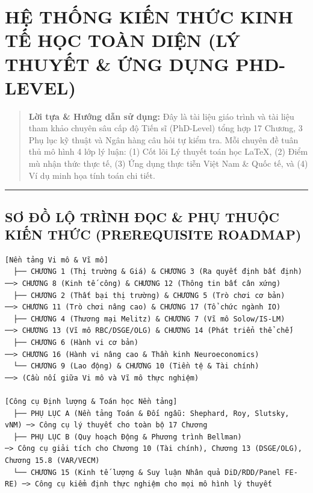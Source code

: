 \documentclass[
]{article}
\author{}
\date{}
\begin{document}
\section{HỆ THỐNG KIẾN THỨC KINH TẾ HỌC TOÀN DIỆN (LÝ THUYẾT \& ỨNG DỤNG
PHD-LEVEL)}\label{hux1ec7-thux1ed1ng-kiux1ebfn-thux1ee9c-kinh-tux1ebf-hux1ecdc-touxe0n-diux1ec7n-luxfd-thuyux1ebft-ux1ee9ng-dux1ee5ng-phd-level}

\begin{quote}
\textbf{Lời tựa \& Hướng dẫn sử dụng:} Đây là tài liệu giáo trình và tài
liệu tham khảo chuyên sâu cấp độ Tiến sĩ (PhD-Level) tổng hợp 17 Chương,
3 Phụ lục kỹ thuật và Ngân hàng câu hỏi tự kiểm tra. Mỗi chuyên đề tuân
thủ mô hình 4 lớp lý luận: (1) Cốt lõi Lý thuyết toán học LaTeX, (2)
Điểm mù nhận thức thực tế, (3) Ứng dụng thực tiễn Việt Nam \& Quốc tế,
và (4) Ví dụ minh họa tính toán chi tiết.
\end{quote}

\begin{center}\rule{0.5\linewidth}{0.5pt}\end{center}

\subsection{SƠ ĐỒ LỘ TRÌNH ĐỌC \& PHỤ THUỘC KIẾN THỨC (PREREQUISITE
ROADMAP)}\label{sux1a1-ux111ux1ed3-lux1ed9-truxecnh-ux111ux1ecdc-phux1ee5-thuux1ed9c-kiux1ebfn-thux1ee9c-prerequisite-roadmap}

\begin{verbatim}
[Nền tảng Vi mô & Vĩ mô]
  ├── CHƯƠNG 1 (Thị trường & Giá) & CHƯƠNG 3 (Ra quyết định bất định) ──> CHƯƠNG 8 (Kinh tế công) & CHƯƠNG 12 (Thông tin bất cân xứng)
  ├── CHƯƠNG 2 (Thất bại thị trường) & CHƯƠNG 5 (Trò chơi cơ bản)     ──> CHƯƠNG 11 (Trò chơi nâng cao) & CHƯƠNG 17 (Tổ chức ngành IO)
  ├── CHƯƠNG 4 (Thương mại Melitz) & CHƯƠNG 7 (Vĩ mô Solow/IS-LM)      ──> CHƯƠNG 13 (Vĩ mô RBC/DSGE/OLG) & CHƯƠNG 14 (Phát triển thể chế)
  ├── CHƯƠNG 6 (Hành vi cơ bản)                                        ──> CHƯƠNG 16 (Hành vi nâng cao & Thần kinh Neuroeconomics)
  └── CHƯƠNG 9 (Lao động) & CHƯƠNG 10 (Tiền tệ & Tài chính)            ──> (Cầu nối giữa Vi mô và Vĩ mô thực nghiệm)

[Công cụ Định lượng & Toán học Nền tảng]
  ├── PHỤ LỤC A (Nền tảng Toán & Đối ngẫu: Shephard, Roy, Slutsky, vNM) ─> Công cụ lý thuyết cho toàn bộ 17 Chương
  ├── PHỤ LỤC B (Quy hoạch Động & Phương trình Bellman)                 ─> Công cụ giải tích cho Chương 10 (Tài chính), Chương 13 (DSGE/OLG), Chương 15.8 (VAR/VECM)
  └── CHƯƠNG 15 (Kinh tế lượng & Suy luận Nhân quả DiD/RDD/Panel FE-RE) ─> Công cụ kiểm định thực nghiệm cho mọi mô hình lý thuyết
\end{verbatim}
\end{document}
